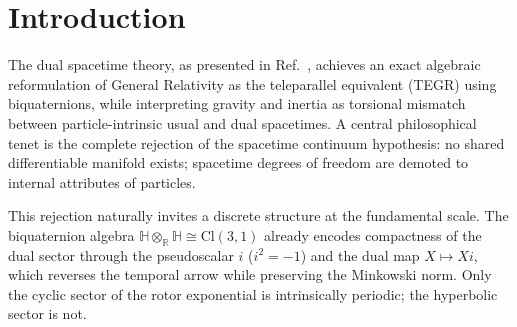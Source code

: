 \documentclass[a4paper]{article}
\theoremstyle{definition}
\begin{document}
\section{Introduction}
\label{sec:intro}

The dual spacetime theory, as presented in Ref.~\cite{main-paper}, achieves an exact algebraic reformulation of General Relativity as the teleparallel equivalent (TEGR) using biquaternions, while interpreting gravity and inertia as torsional mismatch between particle-intrinsic usual and dual spacetimes. A central philosophical tenet is the complete rejection of the spacetime continuum hypothesis: no shared differentiable manifold exists; spacetime degrees of freedom are demoted to internal attributes of particles.

This rejection naturally invites a discrete structure at the fundamental scale. The biquaternion algebra $\mathbb{H} \otimes_{\mathbb{R}} \mathbb{H} \cong \mathrm{Cl}(3,1)$ already encodes compactness of the dual sector through the pseudoscalar $i$ ($i^2 = -1$) and the dual map $X \mapsto Xi$, which reverses the temporal arrow while preserving the Minkowski norm. Only the cyclic sector of the rotor exponential is intrinsically periodic; the hyperbolic sector is not.
\end{document}
